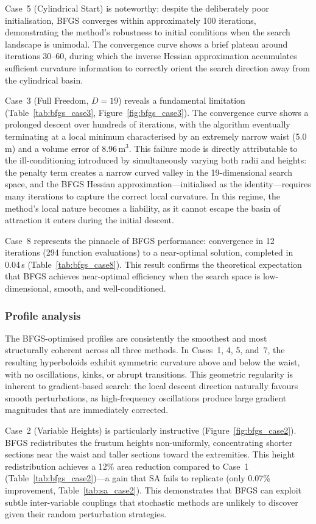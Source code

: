 Case~5 (Cylindrical Start) is noteworthy: despite the deliberately poor initialisation, BFGS converges within approximately 100 iterations, demonstrating the method's robustness to initial conditions when the search landscape is unimodal. The convergence curve shows a brief plateau around iterations 30--60, during which the inverse Hessian approximation accumulates sufficient curvature information to correctly orient the search direction away from the cylindrical basin.

Case~3 (Full Freedom, $D = 19$) reveals a fundamental limitation (Table~\ref{tab:bfgs_case3}, Figure~\ref{fig:bfgs_case3}). The convergence curve shows a prolonged descent over hundreds of iterations, with the algorithm eventually terminating at a local minimum characterised by an extremely narrow waist (5.0\,m) and a volume error of 8.96\,m$^3$. This failure mode is directly attributable to the ill-conditioning introduced by simultaneously varying both radii and heights: the penalty term creates a narrow curved valley in the 19-dimensional search space, and the BFGS Hessian approximation---initialised as the identity---requires many iterations to capture the correct local curvature. In this regime, the method's local nature becomes a liability, as it cannot escape the basin of attraction it enters during the initial descent.

Case~8 represents the pinnacle of BFGS performance: convergence in 12 iterations (294 function evaluations) to a near-optimal solution, completed in 0.04\,s (Table~\ref{tab:bfgs_case8}). This result confirms the theoretical expectation that BFGS achieves near-optimal efficiency when the search space is low-dimensional, smooth, and well-conditioned.

\subsubsection{Profile analysis}

The BFGS-optimised profiles are consistently the smoothest and most structurally coherent across all three methods. In Cases~1, 4, 5, and~7, the resulting hyperboloids exhibit symmetric curvature above and below the waist, with no oscillations, kinks, or abrupt transitions. This geometric regularity is inherent to gradient-based search: the local descent direction naturally favours smooth perturbations, as high-frequency oscillations produce large gradient magnitudes that are immediately corrected.

Case~2 (Variable Heights) is particularly instructive (Figure~\ref{fig:bfgs_case2}). BFGS redistributes the frustum heights non-uniformly, concentrating shorter sections near the waist and taller sections toward the extremities. This height redistribution achieves a 12\% area reduction compared to Case~1 (Table~\ref{tab:bfgs_case2})---a gain that SA fails to replicate (only 0.07\% improvement, Table~\ref{tab:sa_case2}). This demonstrates that BFGS can exploit subtle inter-variable couplings that stochastic methods are unlikely to discover given their random perturbation strategies.

